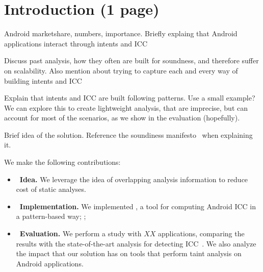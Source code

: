 \section{Introduction (1 page)}

Android marketshare, numbers, importance. 
Briefly explaing that Android applications interact through intents and ICC

Discuss past analysis, how they often are built for soundness, and therefore suffer on scalability. Also mention about trying to capture each and every way of building intents and ICC

Explain that intents and ICC are built following patterns. Use a small
example? We can explore this to create lightweight analysis, that are imprecise, but can account for most of the scenarios, as we show in the evaluation (hopefully). 

Brief idea of the solution. Reference the soundiness manifesto~\cite{soundiness-manifesto} when explaining it.

We make the following contributions:
\begin{itemize}
 \item~\textbf{Idea.} We leverage the idea of overlapping analysis information to
   reduce cost of static analyses.
 \item~\textbf{Implementation.} We implemented \pbicc, a tool for computing Android ICC in a
   pattern-based way; ;
 \item~\textbf{Evaluation.} We perform a study with $XX$ applications, comparing the results with the state-of-the-art analysis for detecting ICC~\cite{epicc,iccta,comdroid}. We also analyze the impact that our solution has on tools that perform taint analysis on Android applications. 
\end{itemize}


